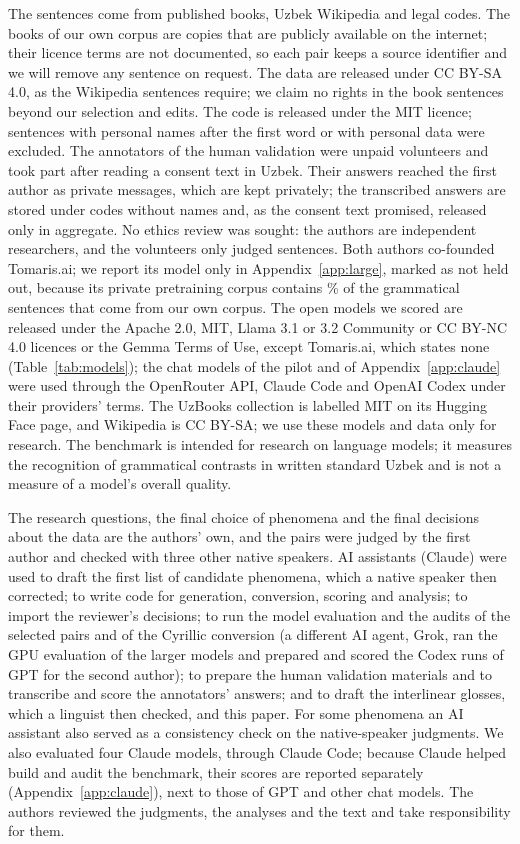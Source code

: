 \documentclass[11pt]{article}
\makeatletter
\DeclareRobustCommand{\Num}[1]{\@ifundefined{uzb@#1}{\textbf{??#1??}}{\@nameuse{uzb@#1}}}
\makeatother
\begin{document}
The sentences come from published books, Uzbek Wikipedia and legal codes. The books of our own corpus are copies that are publicly available on the internet; their licence terms are not documented, so each pair keeps a source identifier and we will remove any sentence on request. The data are released under CC BY-SA 4.0, as the Wikipedia sentences require; we claim no rights in the book sentences beyond our selection and edits. The code is released under the MIT licence; sentences with personal names after the first word or with personal data were excluded. The annotators of the human validation were unpaid volunteers and took part after reading a consent text in Uzbek. Their answers reached the first author as private messages, which are kept privately; the transcribed answers are stored under codes without names and, as the consent text promised, released only in aggregate. No ethics review was sought: the authors are independent researchers, and the volunteers only judged sentences. Both authors co-founded Tomaris.ai; we report its model only in Appendix~\ref{app:large}, marked as not held out, because its private pretraining corpus contains \Num{tom@own@pct}\% of the grammatical sentences that come from our own corpus. The open models we scored are released under the Apache 2.0, MIT, Llama 3.1 or 3.2 Community or CC BY-NC 4.0 licences or the Gemma Terms of Use, except Tomaris.ai, which states none (Table~\ref{tab:models}); the chat models of the pilot and of Appendix~\ref{app:claude} were used through the OpenRouter API, Claude Code and OpenAI Codex under their providers' terms. The UzBooks collection is labelled MIT on its Hugging Face page, and Wikipedia is CC BY-SA; we use these models and data only for research. The benchmark is intended for research on language models; it measures the recognition of grammatical contrasts in written standard Uzbek and is not a measure of a model's overall quality.

The research questions, the final choice of phenomena and the final decisions about the data are the authors' own, and the pairs were judged by the first author and checked with three other native speakers. AI assistants (Claude) were used to draft the first list of candidate phenomena, which a native speaker then corrected; to write code for generation, conversion, scoring and analysis; to import the reviewer's decisions; to run the model evaluation and the audits of the selected pairs and of the Cyrillic conversion (a different AI agent, Grok, ran the GPU evaluation of the larger models and prepared and scored the Codex runs of GPT for the second author); to prepare the human validation materials and to transcribe and score the annotators' answers; and to draft the interlinear glosses, which a linguist then checked, and this paper. For some phenomena an AI assistant also served as a consistency check on the native-speaker judgments. We also evaluated four Claude models, through Claude Code; because Claude helped build and audit the benchmark, their scores are reported separately (Appendix~\ref{app:claude}), next to those of GPT and other chat models. The authors reviewed the judgments, the analyses and the text and take responsibility for them.
\end{document}
